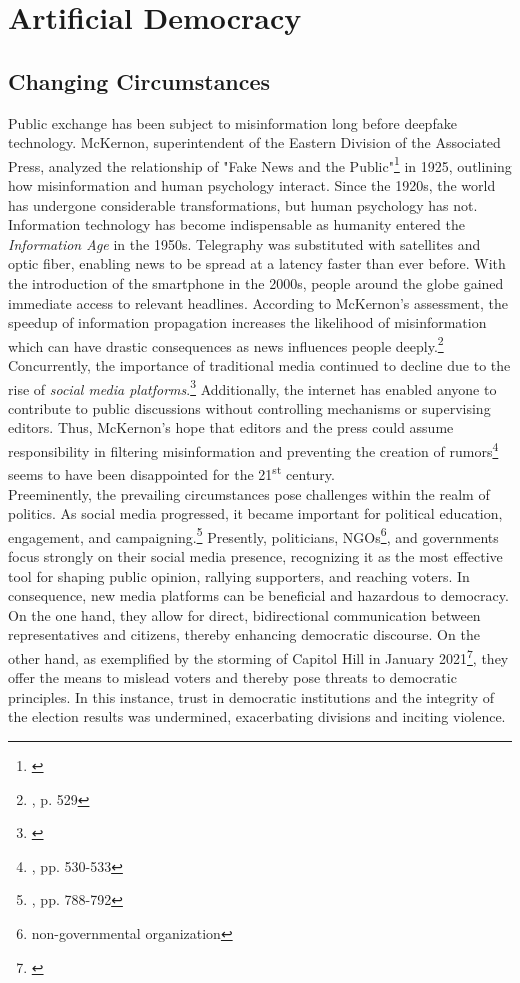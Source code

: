 \documentclass[wide]{adonis}
\begin{document}
 
	\section{Artificial Democracy}
        
        \subsection{Changing Circumstances}
        Public exchange has been subject to misinformation long before deepfake technology. McKernon, superintendent of the Eastern Division of the Associated Press, analyzed the relationship of "Fake News and the Public"\footnote{\cite{mckernon1925}} in 1925, outlining how misinformation and human psychology interact. 
        Since the 1920s, the world has undergone considerable transformations, but human psychology has not.
        Information technology has become indispensable as humanity entered the \textit{Information Age} in the 1950s. Telegraphy was substituted with satellites and optic fiber, enabling news to be spread at a latency faster than ever before. With the introduction of the smartphone in the 2000s, people around the globe gained immediate access to relevant headlines. 
        According to McKernon's assessment, the speedup of information propagation increases the likelihood of misinformation which can have drastic consequences as news influences people deeply.\footnote{\cite{mckernon1925}, p. 529} Concurrently, the importance of traditional media continued to decline due to the rise of \textit{social media platforms}.\footnote{\cite{owid-rise-of-social-media}} Additionally, the internet has enabled anyone to contribute to public discussions without controlling mechanisms or supervising editors. Thus, McKernon's hope that editors and the press could assume responsibility in filtering misinformation and preventing the creation of rumors\footnote{\cite{mckernon1925}, pp. 530-533} seems to have been disappointed for the 21\textsuperscript{st} century. \\
        Preeminently, the prevailing circumstances pose challenges within the realm of politics. As social media progressed, it became important for political education, engagement, and campaigning.\footnote{\cite{Calderaro2018}, pp. 788-792} Presently, politicians, NGOs\footnote{non-governmental organization}, and governments focus strongly on their social media presence, recognizing it as the most effective tool for shaping public opinion, rallying supporters, and reaching voters. In consequence, new media platforms can be beneficial and hazardous to democracy. On the one hand, they allow for direct, bidirectional communication between representatives and citizens, thereby enhancing democratic discourse. On the other hand, as exemplified by the storming of Capitol Hill in January 2021\footnote{\cite{storm-capitol}}, they offer the means to mislead voters and thereby pose threats to democratic principles. In this instance, trust in democratic institutions and the integrity of the election results was undermined, exacerbating divisions and inciting violence.\\ 
\end{document}
